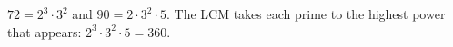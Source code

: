 $72=2^3\cdot3^2$ and $90=2\cdot3^2\cdot5$. The LCM takes each prime to the highest power that appears: $2^3\cdot3^2\cdot5=\boxed{360}$.
